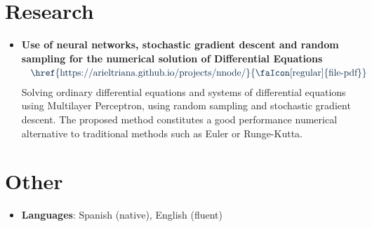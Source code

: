 \documentclass[a4paper]{mctemplate} %
\begin{document}
\begin{main}

\section{Research}
\vspace{-.2cm}

\begin{itemize}
    \item \textbf{Use of neural networks, stochastic gradient descent and random sampling for the numerical solution of Differential Equations}
    \hfill
    {$
    \begin{array}{c}
    \begin{tikzpicture}
        \node[scale=1, maincolor] at (.5,0){\href{https://arieltriana.github.io/projects/nnode/}{\faIcon[regular]{file-pdf}}};
    \end{tikzpicture}
    \end{array}
    $}
    \newline
    Solving ordinary differential equations and systems of differential equations using Multilayer Perceptron, using random sampling and stochastic gradient descent. The proposed method constitutes a good performance numerical alternative to traditional methods such as Euler or Runge-Kutta.
    \vspace{.3cm}
\end{itemize}

        
        
\section{Other}
\vspace{-.2cm}
\begin{itemize}
    \item \textbf{Languages}: Spanish (native), English (fluent)
\end{itemize}

\end{main}
\end{document}
